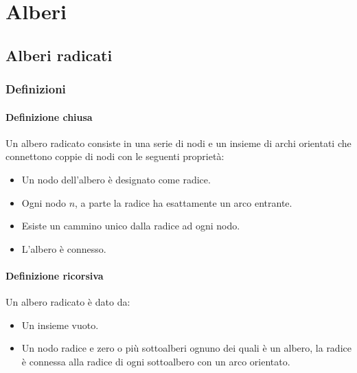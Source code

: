 \chapter{Alberi}
\section{Alberi radicati}
\subsection{Definizioni}
\subsubsection{Definizione chiusa}
Un albero radicato consiste in una serie di nodi e un insieme di archi orientati che connettono coppie di nodi con le seguenti propriet\`a:
\begin{itemize}
    \item Un nodo dell'albero \`e designato come radice.
    \item Ogni nodo $n$, a parte la radice ha esattamente un arco entrante.
    \item Esiste un cammino unico dalla radice ad ogni nodo.
    \item L'albero \`e connesso.
\end{itemize}
\subsubsection{Definizione ricorsiva}
Un albero radicato \`e dato da:
\begin{itemize}
    \item Un insieme vuoto.
    \item Un nodo radice e zero o pi\`u sottoalberi ognuno dei quali \`e un albero, la radice \`e connessa alla radice di ogni sottoalbero con un arco orientato.
\end{itemize}
